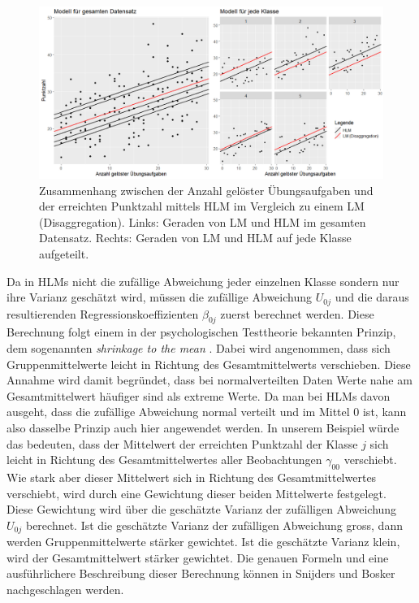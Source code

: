 \documentclass[12pt, a4paper]{article}\usepackage[]{graphicx}\usepackage[]{color}
\begin{document}
\begin{figure}[ht!]
\centering
\includegraphics[width = \textwidth]{./figures/random_intercept}
\caption{Zusammenhang zwischen der Anzahl gelöster Übungsaufgaben und der erreichten Punktzahl mittels HLM im Vergleich zu einem LM (Disaggregation). Links: Geraden von LM und HLM im gesamten Datensatz. Rechts: Geraden von LM und HLM auf jede Klasse aufgeteilt.}
\label{fig:random_intercept}
\end{figure}

Da in HLMs nicht die zufällige Abweichung jeder einzelnen Klasse sondern nur ihre Varianz geschätzt wird, müssen die zufällige Abweichung $U_{0j}$ und die daraus resultierenden Regressionskoeffizienten $\beta_{0j}$ zuerst berechnet werden. Diese Berechnung folgt einem in der psychologischen Testtheorie bekannten Prinzip, dem sogenannten \textit{shrinkage to the mean} \citep{SnijdersTomA.B2012Ma:a}. Dabei wird angenommen, dass sich Gruppenmittelwerte leicht in Richtung des Gesamtmittelwerts verschieben. Diese Annahme wird damit begründet, dass bei normalverteilten Daten Werte nahe am Gesamtmittelwert häufiger sind als extreme Werte. Da man bei HLMs davon ausgeht, dass die zufällige Abweichung normal verteilt und im Mittel 0 ist, kann also dasselbe Prinzip auch hier angewendet werden. In unserem Beispiel würde das bedeuten, dass der Mittelwert der erreichten Punktzahl der Klasse $j$ sich leicht in Richtung des Gesamtmittelwertes aller Beobachtungen $\gamma_{00}$ verschiebt. Wie stark aber dieser Mittelwert sich in Richtung des Gesamtmittelwertes verschiebt, wird durch eine Gewichtung dieser beiden Mittelwerte festgelegt. Diese Gewichtung wird über die geschätzte Varianz der zufälligen Abweichung $U_{0j}$ berechnet. Ist die geschätzte Varianz der zufälligen Abweichung gross, dann werden Gruppenmittelwerte stärker gewichtet. Ist die geschätzte Varianz klein, wird der Gesamtmittelwert stärker gewichtet. Die genauen Formeln und eine ausführlichere Beschreibung dieser Berechnung können in Snijders und Bosker \citeyearpar[][Abschnitt 4.8]{SnijdersTomA.B2012Ma:a} nachgeschlagen werden.
\end{document}
